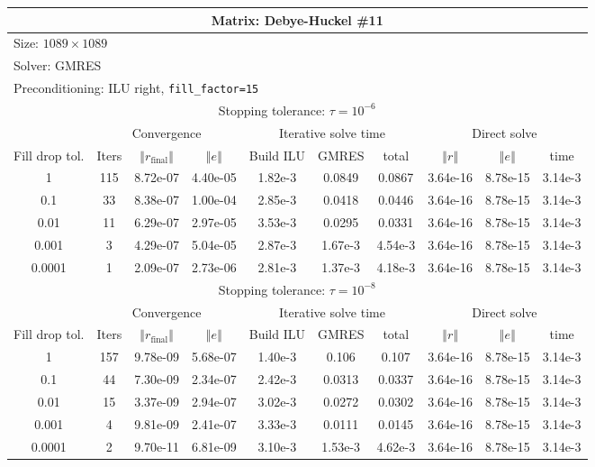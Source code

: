 \documentclass[oneside,final]{amsart}  %
\begin{document}
\begin{tabular}{|c|c|c|c|c|c|c|c|c|c|}
\hline
\multicolumn{10}{|c|}{Matrix: Debye-Huckel \#11}\tabularnewline
\hline
  \multicolumn{10}{|l|}{Size: $1089\times1089$}\tabularnewline
\hline
\multicolumn{10}{|l|}{Solver: GMRES}\tabularnewline
\hline
\multicolumn{10}{|l|}{Preconditioning: ILU right, \texttt{fill\_factor=15}}\tabularnewline
\hline
\hline
\multicolumn{10}{|c|}{Stopping tolerance: $\tau=10^{-6}$}\tabularnewline
\hline
\hline
 & \multicolumn{3}{c|}{Convergence} & \multicolumn{3}{c|}{Iterative solve time} & \multicolumn{3}{c|}{Direct solve}\tabularnewline
\hline
Fill drop tol.  & Iters & $\left\Vert r_{\text{final}}\right\Vert $  & $\left\Vert e\right\Vert $  & Build ILU  & GMRES  & total  & $\left\Vert r\right\Vert $ & $\left\Vert e\right\Vert $  & time\tabularnewline
\hline
1      & 115 & 8.72e-07 & 4.40e-05 & 1.82e-3 &  0.0849 &  0.0867 & 3.64e-16 & 8.78e-15 &   3.14e-3\\
  \hline
0.1    & 33  & 8.38e-07 & 1.00e-04 & 2.85e-3 &  0.0418 &  0.0446 & 3.64e-16 & 8.78e-15 &   3.14e-3\\
  \hline
0.01   & 11  & 6.29e-07 & 2.97e-05 & 3.53e-3 &  0.0295 &  0.0331 & 3.64e-16 & 8.78e-15 &   3.14e-3\\
  \hline
0.001  & 3   & 4.29e-07 & 5.04e-05 & 2.87e-3 & 1.67e-3 & 4.54e-3 & 3.64e-16 & 8.78e-15 &   3.14e-3\\
  \hline
0.0001 & 1   & 2.09e-07 & 2.73e-06 & 2.81e-3 & 1.37e-3 & 4.18e-3 & 3.64e-16 & 8.78e-15 &   3.14e-3\\
  \hline
\hline
\multicolumn{10}{|c|}{Stopping tolerance: $\tau=10^{-8}$}\tabularnewline
\hline
\hline
 & \multicolumn{3}{c|}{Convergence} & \multicolumn{3}{c|}{Iterative solve time} & \multicolumn{3}{c|}{Direct solve }\tabularnewline
\hline
Fill drop tol.  & Iters  & $\left\Vert r_{\text{final}}\right\Vert $  & $\left\Vert e\right\Vert $ & Build ILU  & GMRES  & total  & $\left\Vert r\right\Vert $  & $\left\Vert e\right\Vert $  & time\tabularnewline
\hline
1      & 157 & 9.78e-09 & 5.68e-07 & 1.40e-3 &   0.106 &   0.107 & 3.64e-16 & 8.78e-15 &   3.14e-3\\
  \hline
0.1    & 44  & 7.30e-09 & 2.34e-07 & 2.42e-3 &  0.0313 &  0.0337 & 3.64e-16 & 8.78e-15 &   3.14e-3\\
  \hline
0.01   & 15  & 3.37e-09 & 2.94e-07 & 3.02e-3 &  0.0272 &  0.0302 & 3.64e-16 & 8.78e-15 &   3.14e-3\\
  \hline
0.001  & 4   & 9.81e-09 & 2.41e-07 & 3.33e-3 &  0.0111 &  0.0145 & 3.64e-16 & 8.78e-15 &   3.14e-3\\
  \hline
0.0001 & 2   & 9.70e-11 & 6.81e-09 & 3.10e-3 & 1.53e-3 & 4.62e-3 & 3.64e-16 & 8.78e-15 &   3.14e-3\\
  \hline
\end{tabular}
\end{document}
